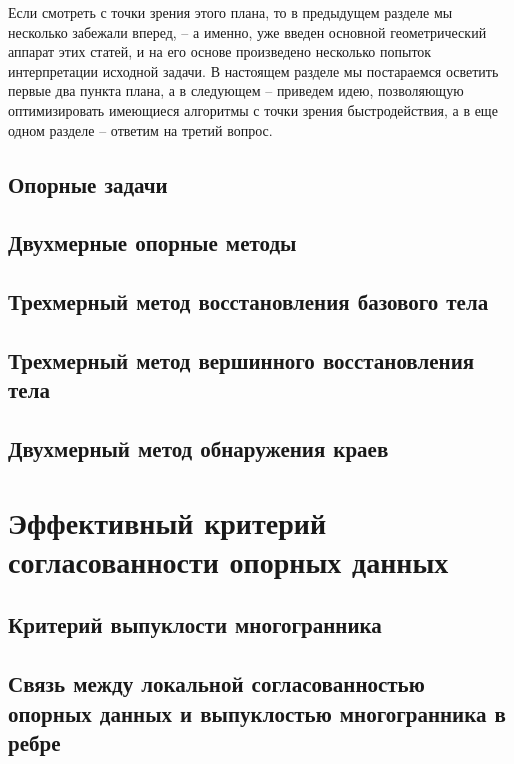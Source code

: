 \documentclass[a4paper, 12pt, titlepage]{article}
\theoremstyle{definition}
\theoremstyle{plain}
\theoremstyle{plain}
\begin{document}
Если смотреть с точки зрения этого плана, то в предыдущем разделе мы несколько
забежали вперед, -- а именно, уже введен основной геометрический аппарат этих
статей, и на его основе произведено несколько попыток интерпретации исходной
задачи. В настоящем разделе мы постараемся осветить первые два пункта плана, а
в следующем -- приведем идею, позволяющую оптимизировать имеющиеся алгоритмы с
точки зрения быстродействия, а в еще одном разделе -- ответим на третий вопрос.

\subsection{Опорные задачи}

\subsection{Двухмерные опорные методы}

\subsection{Трехмерный метод восстановления базового тела}

\subsection{Трехмерный метод вершинного восстановления тела}

\subsection{Двухмерный метод обнаружения краев}


\section{Эффективный критерий согласованности опорных данных}

\subsection{Критерий выпуклости многогранника}

\subsection{Связь между локальной согласованностью опорных данных и выпуклостью
многогранника в ребре}
\end{document}
